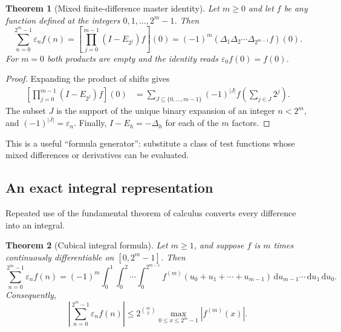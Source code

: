 \documentclass[11pt,oneside]{article}
\newtheorem{theorem}{Theorem}[section]
\theoremstyle{definition}
\theoremstyle{remark}
\newcommand{\dd}{\,\mathrm d}
\begin{document}
\begin{theorem}[Mixed finite-difference master identity]
\label{thm:finite-difference-master}
Let $m\ge0$ and let $f$ be any function defined at the integers
$0,1,\ldots,2^m-1$.  Then
\begin{equation}
 \boxed{\displaystyle
 \sum_{n=0}^{2^m-1}\varepsilon_nf(n)
 =\left[\prod_{j=0}^{m-1}(I-E_{2^j})f\right](0)
 =(-1)^m
   (\Delta_1\Delta_2\cdots\Delta_{2^{m-1}}f)(0).}         \label{eq:finite-difference-master}
\end{equation}
For $m=0$ both products are empty and the identity reads
$\varepsilon_0f(0)=f(0)$.
\end{theorem}

\begin{proof}
Expanding the product of shifts gives
\begin{align*}
 \left[\prod_{j=0}^{m-1}(I-E_{2^j})f\right](0)
 &=\sum_{J\subseteq\{0,\ldots,m-1\}}
   (-1)^{|J|}
   f\left(\sum_{j\in J}2^j\right).
\end{align*}
The subset $J$ is the support of the unique binary expansion of an integer
$n<2^m$, and $(-1)^{|J|}=\varepsilon_n$.  Finally,
$I-E_h=-\Delta_h$ for each of the $m$ factors.
\end{proof}

This is a useful ``formula generator'': substitute a class of test functions
whose mixed differences or derivatives can be evaluated.

\subsection{An exact integral representation}

Repeated use of the fundamental theorem of calculus converts every difference
into an integral.

\begin{theorem}[Cubical integral formula]
\label{thm:cubical-integral}
Let $m\ge1$, and suppose $f$ is $m$ times continuously differentiable on
$[0,2^m-1]$.  Then
\begin{equation}
 \boxed{\displaystyle
 \sum_{n=0}^{2^m-1}\varepsilon_nf(n)
 =(-1)^m
 \int_0^1\!\int_0^2\!\cdots\!\int_0^{2^{m-1}}
 f^{(m)}(u_0+u_1+\cdots+u_{m-1})
 \dd u_{m-1}\cdots\dd u_1\dd u_0.}                       \label{eq:cubical-integral}
\end{equation}
Consequently,
\begin{equation}
 \left|\sum_{n=0}^{2^m-1}\varepsilon_nf(n)\right|
 \le 2^{\binom m2}
     \max_{0\le x\le2^m-1}|f^{(m)}(x)|.                  \label{eq:cubical-integral-bound}
\end{equation}
\end{theorem}
\end{document}
